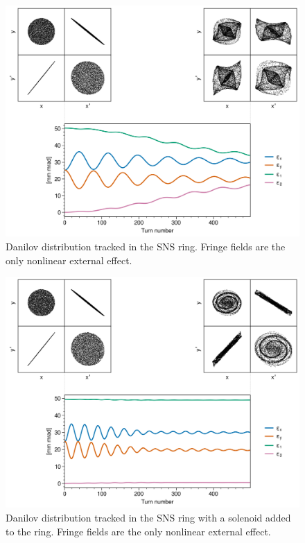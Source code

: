 \begin{figure}[!p]
    \centering
    \includegraphics[width=\textwidth]{Images/chapter3/fringe.png}
    \caption{Danilov distribution tracked in the SNS ring. Fringe fields are the only nonlinear external effect.}
    \label{fig:fringe_a}
    \vspace*{3cm}
\end{figure}

\begin{figure}[!p]
    \centering
    \includegraphics[width=\textwidth]{Images/chapter3/fringe_solenoid.png}
    \caption{Danilov distribution tracked in the SNS ring with a solenoid added to the ring. Fringe fields are the only nonlinear external effect.}
    \label{fig:fringe_b}
    \vspace*{3cm}
\end{figure}


